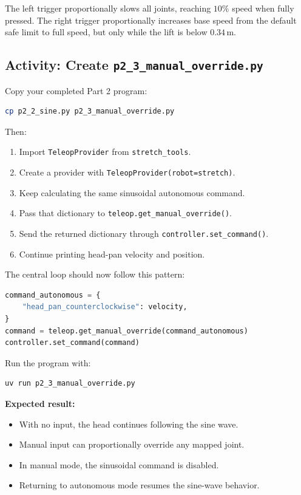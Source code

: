 \documentclass[11pt,a4paper]{article}
\begin{document}
The left trigger proportionally slows all joints, reaching $10\%$ speed when
fully pressed. The right trigger proportionally increases base speed from the
default safe limit to full speed, but only while the lift is below
$0.34\,\text{m}$.

\subsection*{Activity: Create \texttt{p2\_3\_manual\_override.py}}

Copy your completed Part 2 program:

\begin{lstlisting}[language=bash]
cp p2_2_sine.py p2_3_manual_override.py
\end{lstlisting}

Then:

\begin{enumerate}
    \item Import \texttt{TeleopProvider} from \texttt{stretch\_tools}.
    \item Create a provider with \texttt{TeleopProvider(robot=stretch)}.
    \item Keep calculating the same sinusoidal autonomous command.
    \item Pass that dictionary to \texttt{teleop.get\_manual\_override()}.
    \item Send the returned dictionary through \texttt{controller.set\_command()}.
    \item Continue printing head-pan velocity and position.
\end{enumerate}

The central loop should now follow this pattern:

\begin{lstlisting}[language=Python]
command_autonomous = {
    "head_pan_counterclockwise": velocity,
}
command = teleop.get_manual_override(command_autonomous)
controller.set_command(command)
\end{lstlisting}

Run the program with:

\begin{lstlisting}[language=bash]
uv run p2_3_manual_override.py
\end{lstlisting}

\textbf{Expected result:}

\begin{itemize}
    \item With no input, the head continues following the sine wave.
    \item Manual input can proportionally override any mapped joint.
    \item In manual mode, the sinusoidal command is disabled.
    \item Returning to autonomous mode resumes the sine-wave behavior.
\end{itemize}
\end{document}
